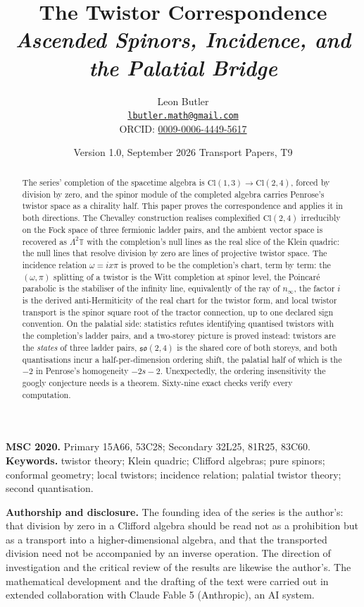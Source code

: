 \documentclass[11pt]{article}
\title{\bfseries The Twistor Correspondence\\[4pt]
  \large\itshape Ascended Spinors, Incidence, and the Palatial Bridge}
\author{Leon Butler\\ \normalsize\href{mailto:lbutler.math@gmail.com}{\texttt{lbutler.math@gmail.com}}\\ \normalsize ORCID: \href{https://orcid.org/0009-0006-4449-5617}{0009-0006-4449-5617}}
\date{Version 1.0, September 2026 \textperiodcentered{} Transport Papers, T9}
\theoremstyle{definition}
\newcommand{\Cl}{\mathrm{Cl}}
\newcommand{\T}{\mathbb{T}}
\newcommand{\nInf}{n_\infty}
\begin{document}
\maketitle

\begin{abstract}
\normalsize
The series' completion of the spacetime algebra is $\Cl(1,3) \to \Cl(2,4)$, forced by division by zero, and the spinor module of the completed algebra carries Penrose's twistor space as a chirality half. This paper proves the correspondence and applies it in both directions. The Chevalley construction realises complexified $\Cl(2,4)$ irreducibly on the Fock space of three fermionic ladder pairs, and the ambient vector space is recovered as $\Lambda^2\T$ with the completion's null lines as the real slice of the Klein quadric: the null lines that resolve division by zero are lines of projective twistor space. The incidence relation $\omega = ix\pi$ is proved to be the completion's chart, term by term: the $(\omega,\pi)$ splitting of a twistor is the Witt completion at spinor level, the Poincar\'e parabolic is the stabiliser of the infinity line, equivalently of the ray of $\nInf$, the factor $i$ is the derived anti-Hermiticity of the real chart for the twistor form, and local twistor transport is the spinor square root of the tractor connection, up to one declared sign convention. On the palatial side: statistics refutes identifying quantised twistors with the completion's ladder pairs, and a two-storey picture is proved instead: twistors are the \emph{states} of three ladder pairs, $\mathfrak{so}(2,4)$ is the shared core of both storeys, and both quantisations incur a half-per-dimension ordering shift, the palatial half of which is the $-2$ in Penrose's homogeneity $-2s-2$. Unexpectedly, the ordering insensitivity the googly conjecture needs is a theorem. Sixty-nine exact checks verify every computation.
\end{abstract}

\medskip
\noindent\textbf{MSC 2020.} Primary 15A66, 53C28; Secondary 32L25, 81R25, 83C60.\\
\textbf{Keywords.} twistor theory; Klein quadric; Clifford algebras; pure spinors; conformal geometry; local twistors; incidence relation; palatial twistor theory; second quantisation.

\newpage
\textbf{Authorship and disclosure. }The founding idea of the series is the author's: that division by zero in a Clifford algebra should be read not as a prohibition but as a transport into a higher-dimensional algebra, and that the transported division need not be accompanied by an inverse operation. The direction of investigation and the critical review of the results are likewise the author's. The mathematical development and the drafting of the text were carried out in extended collaboration with Claude Fable 5 (Anthropic), an AI system.
\end{document}
